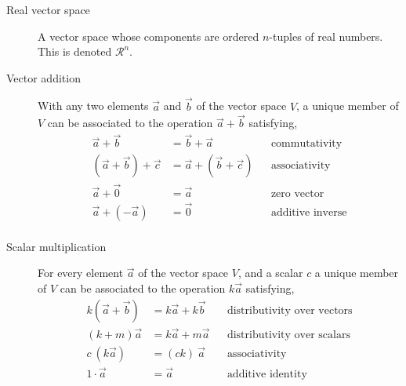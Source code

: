 \begin{description}
    \item[Real vector space] A vector space whose components are ordered $ n $-tuples
        of real numbers. This is denoted $ \mathcal{R}^{n} $. \par

    \item[Vector addition] With any two elements $ \vec{a} $ and $ \vec{b} $ of the
        vector space $ V $, a unique member of $ V $ can be associated to the operation
        $ \vec{a} + \vec{b} $ satisfying,
        \begin{align}
            \vec{a} + \vec{b}             & = \vec{b} + \vec{a}             &
                                          & \text{commutativity}              \\
            (\vec{a} + \vec{b}) + \vec{c} & = \vec{a} + (\vec{b} + \vec{c}) &
                                          & \text{associativity}              \\
            \vec{a} + \vec{0}             & = \vec{a}                       &
                                          & \text{zero vector}                \\
            \vec{a} + (-\vec{a})          & = \vec{0}                       &
                                          & \text{additive inverse}           \\
        \end{align}

    \item[Scalar multiplication] For every element $ \vec{a} $ of the
        vector space $ V $, and a scalar $ c $ a unique member of $ V $ can be associated
        to the operation $ k\vec{a} $ satisfying,
        \begin{align}
            k(\vec{a} + \vec{b}) & = k\vec{a} + k\vec{b}              &
                                 & \text{distributivity over vectors}   \\
            (k + m) \vec{a}      & = k\vec{a} + m\vec{a}              &
                                 & \text{distributivity over scalars}   \\
            c\ (k\vec{a})        & = (ck)\ \vec{a}                    &
                                 & \text{associativity}                 \\
            1 \cdot \vec{a}      & = \vec{a}                          &
                                 & \text{additive identity}
        \end{align}


\end{description}
